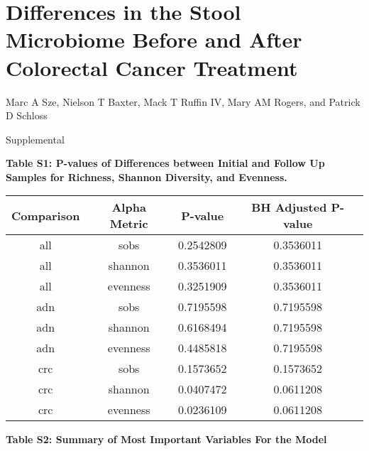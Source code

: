 \documentclass[12pt,]{article}
\title{}
\author{}
\date{}
\begin{document}
\section{Differences in the Stool Microbiome Before and After Colorectal
Cancer
Treatment}\label{differences-in-the-stool-microbiome-before-and-after-colorectal-cancer-treatment}

\vspace{10mm}

\begin{center}
Marc A Sze, Nielson T Baxter, Mack T Ruffin IV, Mary AM Rogers, and Patrick D Schloss

\vspace{10mm}

Supplemental
\end{center}

\newpage

\textbf{Table S1: P-values of Differences between Initial and Follow Up
Samples for Richness, Shannon Diversity, and Evenness.}

\begin{longtable}[]{@{}cccc@{}}
\toprule
Comparison & Alpha Metric & P-value & BH Adjusted P-value\tabularnewline
\midrule
\endhead
all & sobs & 0.2542809 & 0.3536011\tabularnewline
all & shannon & 0.3536011 & 0.3536011\tabularnewline
all & evenness & 0.3251909 & 0.3536011\tabularnewline
adn & sobs & 0.7195598 & 0.7195598\tabularnewline
adn & shannon & 0.6168494 & 0.7195598\tabularnewline
adn & evenness & 0.4485818 & 0.7195598\tabularnewline
crc & sobs & 0.1573652 & 0.1573652\tabularnewline
crc & shannon & 0.0407472 & 0.0611208\tabularnewline
crc & evenness & 0.0236109 & 0.0611208\tabularnewline
\bottomrule
\end{longtable}

\newpage

\textbf{Table S2: Summary of Most Important Variables For the Model}
\end{document}

